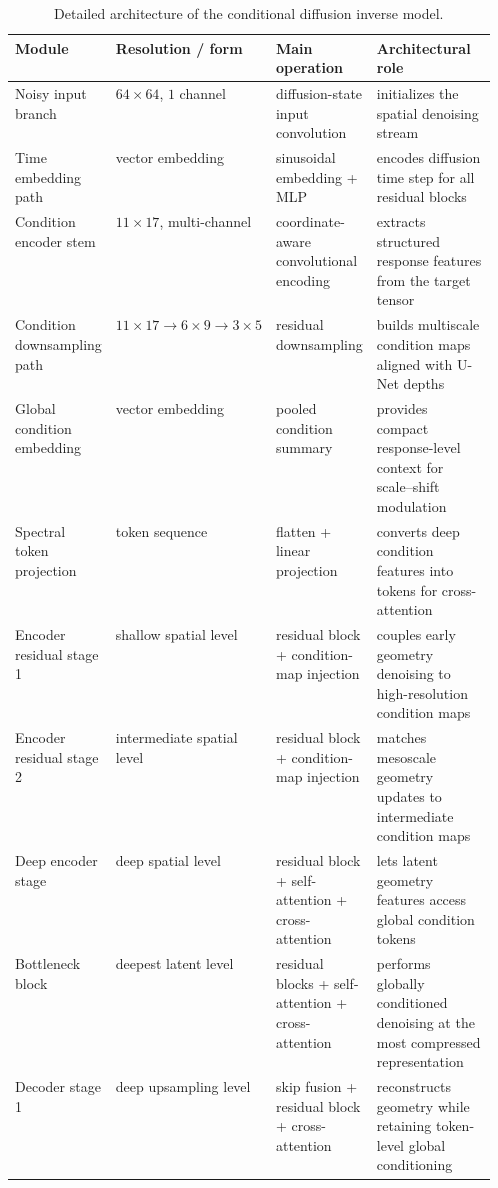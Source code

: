 \documentclass[10pt,a4paper]{article}
\begin{document}
\begin{table}[!htbp]
\centering
\caption{Detailed architecture of the conditional diffusion inverse model.}
\begin{tabularx}{\linewidth}{>{\raggedright\arraybackslash}p{0.20\linewidth}>{\raggedright\arraybackslash}p{0.18\linewidth}>{\raggedright\arraybackslash}p{0.18\linewidth}X}
\toprule
Module & Resolution / form & Main operation & Architectural role \\
\midrule
Noisy input branch & $64\times64$, $1$ channel & diffusion-state input convolution & initializes the spatial denoising stream \\
Time embedding path & vector embedding & sinusoidal embedding + MLP & encodes diffusion time step for all residual blocks \\
Condition encoder stem & $11\times17$, multi-channel & coordinate-aware convolutional encoding & extracts structured response features from the target tensor \\
Condition downsampling path & $11\times17 \rightarrow 6\times9 \rightarrow 3\times5$ & residual downsampling & builds multiscale condition maps aligned with U-Net depths \\
Global condition embedding & vector embedding & pooled condition summary & provides compact response-level context for scale--shift modulation \\
Spectral token projection & token sequence & flatten + linear projection & converts deep condition features into tokens for cross-attention \\
Encoder residual stage 1 & shallow spatial level & residual block + condition-map injection & couples early geometry denoising to high-resolution condition maps \\
Encoder residual stage 2 & intermediate spatial level & residual block + condition-map injection & matches mesoscale geometry updates to intermediate condition maps \\
Deep encoder stage & deep spatial level & residual block + self-attention + cross-attention & lets latent geometry features access global condition tokens \\
Bottleneck block & deepest latent level & residual blocks + self-attention + cross-attention & performs globally conditioned denoising at the most compressed representation \\
Decoder stage 1 & deep upsampling level & skip fusion + residual block + cross-attention & reconstructs geometry while retaining token-level global conditioning \\

\end{tabularx}
\end{table}
\end{document}
